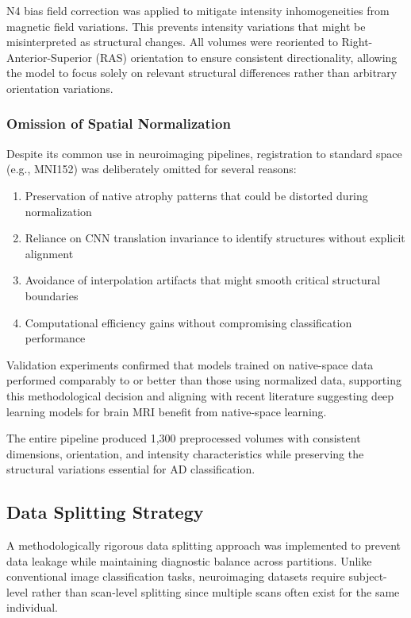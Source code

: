 \documentclass[12pt, a4paper]{article}
\begin{document}
N4 bias field correction was applied to mitigate intensity inhomogeneities from magnetic field variations. This prevents intensity variations that might be misinterpreted as structural changes. All volumes were reoriented to Right-Anterior-Superior (RAS) orientation to ensure consistent directionality, allowing the model to focus solely on relevant structural differences rather than arbitrary orientation variations.

\subsubsection{Omission of Spatial Normalization}

Despite its common use in neuroimaging pipelines, registration to standard space (e.g., MNI152) was deliberately omitted for several reasons:
\begin{enumerate}
    \item Preservation of native atrophy patterns that could be distorted during normalization
    \item Reliance on CNN translation invariance to identify structures without explicit alignment
    \item Avoidance of interpolation artifacts that might smooth critical structural boundaries
    \item Computational efficiency gains without compromising classification performance
\end{enumerate}

Validation experiments confirmed that models trained on native-space data performed comparably to or better than those using normalized data, supporting this methodological decision and aligning with recent literature suggesting deep learning models for brain MRI benefit from native-space learning.

The entire pipeline produced 1,300 preprocessed volumes with consistent dimensions, orientation, and intensity characteristics while preserving the structural variations essential for AD classification.

\subsection{Data Splitting Strategy}

A methodologically rigorous data splitting approach was implemented to prevent data leakage while maintaining diagnostic balance across partitions. Unlike conventional image classification tasks, neuroimaging datasets require subject-level rather than scan-level splitting since multiple scans often exist for the same individual.
\end{document}
